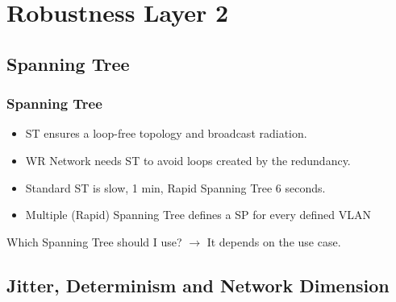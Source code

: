 \documentclass[]{beamer}
\begin{document}
\section{Robustness Layer 2}

\subsection{Spanning Tree}
\begin{frame}
  \frametitle{Spanning Tree}   %
  \begin{itemize}
	\item ST ensures a loop-free topology and broadcast radiation.
	\item WR Network needs ST to avoid loops created by the redundancy.
	\item Standard ST is slow, 1 min, Rapid Spanning Tree 6 seconds.
	\item Multiple (Rapid) Spanning Tree defines a SP for every defined VLAN
  \end{itemize}

Which Spanning Tree should I use? $\rightarrow$ It depends on the use case.

\end{frame}

\subsection{Jitter, Determinism and Network Dimension}
\end{document}
